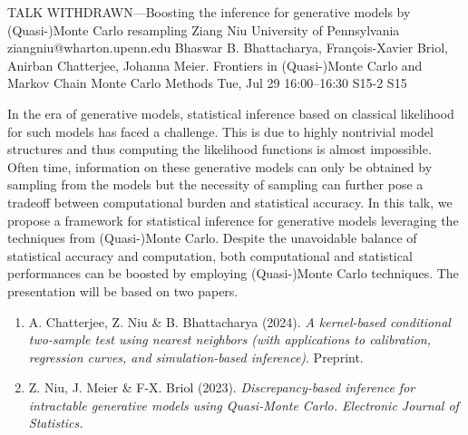 \begin{talk}
  {TALK WITHDRAWN---Boosting the inference for generative models by (Quasi-)Monte Carlo resampling}%
  {Ziang Niu}%
  {University of Pennsylvania}%
  {ziangniu@wharton.upenn.edu}%
  {Bhaswar B. Bhattacharya, Fran\c{c}ois-Xavier Briol, Anirban Chatterjee, Johanna Meier.}%
  {Frontiers in (Quasi-)Monte Carlo and Markov Chain Monte Carlo Methods}%
  {Tue, Jul 29 16:00--16:30}%
  {S15-2}%
  {S15}%
    
   
In the era of generative models, statistical inference based on classical likelihood for such models has faced a challenge. This is due to highly nontrivial model structures and thus computing the likelihood functions is almost impossible. Often time, information on these generative models can only be obtained by sampling from the models but the necessity of sampling can further pose a tradeoff between computational burden and statistical accuracy. In this talk, we propose a framework for statistical inference for generative models leveraging the techniques from (Quasi-)Monte Carlo. Despite the unavoidable balance of statistical accuracy and computation, both computational and statistical performances can be boosted by employing (Quasi-)Monte Carlo techniques. The presentation will be based on two papers.

\begin{enumerate}
 \item[{[1]}] A. Chatterjee, Z. Niu \& B. Bhattacharya (2024). {\it A kernel-based conditional two-sample test using nearest neighbors (with applications to calibration, regression curves, and simulation-based inference)}. Preprint.
 \item[{[2]}] Z. Niu, J. Meier \& F-X. Briol (2023). \it{Discrepancy-based inference for
  intractable generative models using
  Quasi-Monte Carlo.} Electronic Journal of Statistics.
\end{enumerate}

\medskip

\end{talk}

